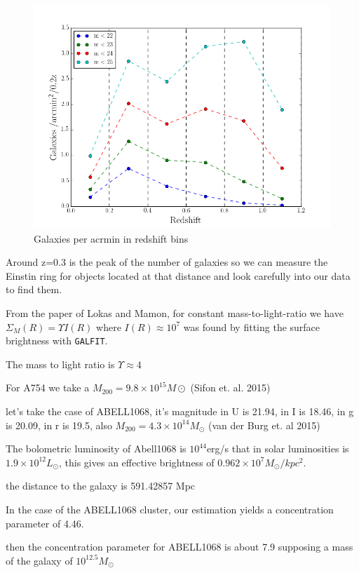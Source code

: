 \begin{figure}[H]
\centering
\includegraphics[width=12cm]{images/galaxies_per_arcmin.png}
\caption[Galaxies per arcmin]{Galaxies per acrmin in redshift bins}
\end{figure}

Around z=0.3 is the peak of the number of galaxies so we can measure the Einstin ring for objects located at that distance and look carefully into our data to find them.

From the paper of Lokas and Mamon, for constant mass-to-light-ratio we have $\Sigma_{M}(R)= \Upsilon I(R)$ where $I(R)\approx 10^{7}$ was found by fitting the surface brightness with \texttt{GALFIT}.

The mass to light ratio is $\Upsilon\approx 4$

For A754 we take a $M_{200}=9.8\times 10^{15} M\odot$ (Sifon et. al. 2015)

let's take the case of ABELL1068, it's magnitude in U is 21.94, in I is 18.46, in g is 20.09, in r is 19.5, also $M_{200}=4.3\times 10^{14}M_{\odot}$ (van der Burg et. al 2015)

The bolometric luminosity of Abell1068 is $10^{44}$erg/s that in solar luminosities is $1.9\times 10^{12} L_{\odot}$, this gives an effective brightness of $0.962\times 10^{7}M_{\odot}/kpc^2$.

the distance to the galaxy is 591.42857 Mpc

In the case of the ABELL1068 cluster, our estimation yields a concentration parameter of 4.46.

then the concentration parameter for ABELL1068 is about 7.9 supposing a mass of the galaxy of $10^{12.5}M_{\odot}$

